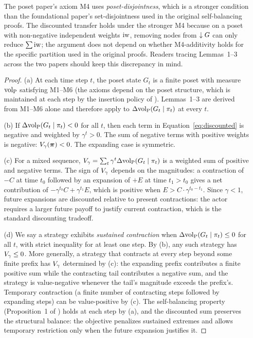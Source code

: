 \begin{remark}
\label{rem:m4_note}
The poset paper's axiom M4 uses \emph{poset-disjointness}, which is a
    stronger condition than the foundational paper's set-disjointness used
    in the original self-balancing proofs. The discounted transfer holds
    under the stronger M4 because on a poset with non-negative independent
    weights $\operatorname{iw}$, removing nodes from $\downarrow G$ can only reduce
    $\sum \operatorname{iw}$; the argument does not depend on whether M4-additivity
    holds for the specific partition used in the original proofs. Readers
    tracing Lemmas~1--3 across the two papers should keep this
    discrepancy in mind.
\end{remark}

\begin{proof}
(a) At each time step $t$, the poset state $G_t$ is a finite poset with
measure ${\operatorname{vol}_{\mathrm{P}}}$ satisfying M1--M6 (the axioms depend on the poset structure,
which is maintained at each step by the insertion policy of
\citet{lasser2026poset}). Lemmas~1--3 are derived from M1--M6 alone and
therefore apply to $\Delta {\operatorname{vol}_{\mathrm{P}}}(G_t \mid \pi_t)$ at every $t$.

(b) If $\Delta {\operatorname{vol}_{\mathrm{P}}}(G_t \mid \pi_t) < 0$ for all $t$, then each term in
Equation~\eqref{eq:discounted} is negative and weighted by $\gamma^t > 0$. The
sum of negative terms with positive weights is negative:
$V_\gamma(\boldsymbol{\pi}) < 0$. The expanding case is symmetric.

(c) For a mixed sequence, $V_\gamma = \sum_t \gamma^t \Delta {\operatorname{vol}_{\mathrm{P}}}(G_t \mid
\pi_t)$ is a weighted sum of positive and negative terms. The sign of
$V_\gamma$ depends on the magnitudes: a contraction of $-C$ at time $t_0$
followed by an expansion of $+E$ at time $t_1 > t_0$ gives a net
contribution of $-\gamma^{t_0} C + \gamma^{t_1} E$, which is positive when
$E > C \cdot \gamma^{t_0 - t_1}$. Since $\gamma < 1$, future expansions are
discounted relative to present contractions: the actor requires a larger
future payoff to justify current contraction, which is the standard
discounting tradeoff.

(d) We say a strategy exhibits \emph{sustained contraction} when
$\Delta {\operatorname{vol}_{\mathrm{P}}}(G_t \mid \pi_t) \leq 0$ for all $t$, with strict inequality
for at least one step. By (b), any such strategy has $V_\gamma \leq 0$. More
generally, a strategy that contracts at every step beyond some finite prefix
has $V_\gamma$ determined by (c): the expanding prefix contributes a finite
positive sum while the contracting tail contributes a negative sum, and
the strategy is value-negative whenever the tail's magnitude exceeds
the prefix's. Temporary contraction (a finite number of contracting steps
followed by expanding steps) can be value-positive by (c). The
self-balancing property (Proposition~1 of \citet{lasser2026gfm}) holds at
each step by (a), and the discounted sum preserves the structural balance:
the objective penalizes sustained extremes and allows temporary restriction
only when the future expansion justifies it.
\end{proof}

